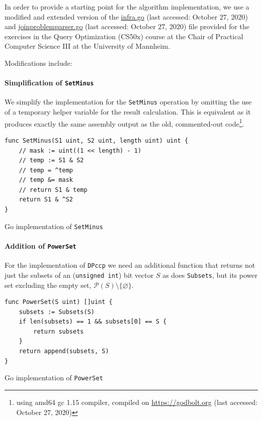 In order to provide a starting point for the algorithm implementation, we use a modified and extended version of the \url{infra.go} (last accessed: October 27, 2020) and \url{joinproblemparser.go} (last accessed: October 27, 2020) file provided for the exercises in the Query Optimization (CS50x) course \texttt{} at the Chair of Practical Computer Science III at the University of Mannheim.

Modifications include:
\paragraph{Simplification of \texttt{SetMinus}}
We simplify the implementation for the \texttt{SetMinus} operation by omitting the use of a temporary helper variable for the result calculation. This is equivalent as it produces exactly the same assembly output as the old, commented-out code\footnote{using amd64 gc 1.15 compiler, compiled on \url{https://godbolt.org} (last accessed: October 27, 2020)}.

\begin{algorithm}
\begin{verbatim}
func SetMinus(S1 uint, S2 uint, length uint) uint {
    // mask := uint((1 << length) - 1)
    // temp := S1 & S2
    // temp = ^temp
    // temp &= mask
    // return S1 & temp
    return S1 & ^S2
}
\end{verbatim}
\caption{Go implementation of \texttt{SetMinus}}
\label{alg:implementation-setminus}
\end{algorithm}

\paragraph{Addition of \texttt{PowerSet}}
For the implementation of \texttt{DPccp} we need an additional function that returns not just the subsets of an (\texttt{unsigned int}) bit vector $S$ as does \texttt{Subsets}, but its power set excluding the empty set, $\mathcal P(S)\setminus\{\varnothing\}$.

\begin{algorithm}
\begin{verbatim}
func PowerSet(S uint) []uint {
    subsets := Subsets(S)
    if len(subsets) == 1 && subsets[0] == S {
        return subsets
    }
    return append(subsets, S)
}
\end{verbatim}
\caption{Go implementation of \texttt{PowerSet}}
\label{alg:implementation-powerset}
\end{algorithm}

